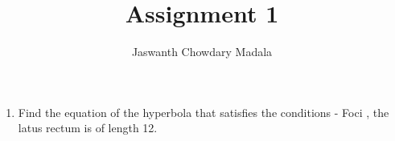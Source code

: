 \documentclass[journal,12pt,twocolumn]{IEEEtran}
\begin{document}
\vspace{3cm}


\title{Assignment 1}
\author{Jaswanth Chowdary Madala}





\maketitle

\newpage


\bigskip

\renewcommand{\thefigure}{\theenumi}
\renewcommand{\thetable}{\theenumi}


\begin{enumerate}
\item Find the equation of the hyperbola that satisfies the conditions - Foci , the latus rectum is of length 12.


\end{enumerate}
\end{document}
